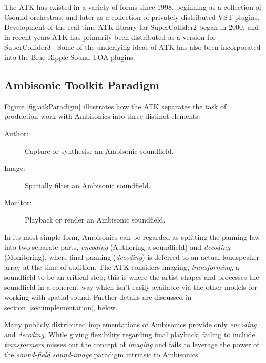 \documentclass{article}
\begin{document}
The ATK has existed in a variety of forms since 1998, beginning as a collection of Csound orchestras, and later as a collection of privately distributed VST plugins.
Development of the real-time ATK library for SuperCollider2 began in 2000, and in recent years ATK has primarily been distributed as a version for SuperCollider3 \cite{Anderson:2009introducingATK}.
Some of the underlying ideas of ATK has also been incorporated into the Blue Ripple Sound TOA plugins.

\subsection{Ambisonic Toolkit Paradigm}\label{sec:atk-model}



Figure \ref{fig:atkParadigm} illustrates how the ATK separates the task of production work with Ambisonics into three distinct elements:

\begin{description}
  \item[Author:] Capture or synthesise an Ambisonic soundfield.
  \item[Image:] Spatially filter an Ambisonic soundfield.
  \item[Monitor:] Playback or render an Ambisonic soundfield.
\end{description}

In its most simple form, Ambisonics can be regarded as splitting the panning law into two separate parts, \emph{encoding} (Authoring a soundfield) and \emph{decoding} (Monitoring), where final panning (\emph{decoding}) is deferred to an actual loudspeaker array at the time of audition. The ATK considers imaging, \emph{transforming}, a soundfield to be an critical step; this is where the artist shapes and processes the soundfield in a coherent way which isn't easily available via the other models for working with spatial sound. Further details are discussed in section~\ref{sec:implementation}, below.

Many publicly distributed implementations of Ambisonics provide only \emph{encoding} and \emph{decoding}. While giving flexibility regarding final playback, failing to include \emph{transformers} misses out the concept of \emph{imaging} and fails to leverage the power of the \emph{sound-field sound-image} paradigm intrinsic to Ambisonics.
\end{document}
